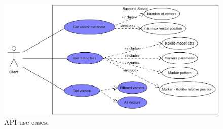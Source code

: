 \begin{figure}
	\centering
	\includegraphics[width=1\linewidth]{images/backend/APIUseCases}
	\caption{API use cases.}
	\label{fig:backendUseCase}
\end{figure}


